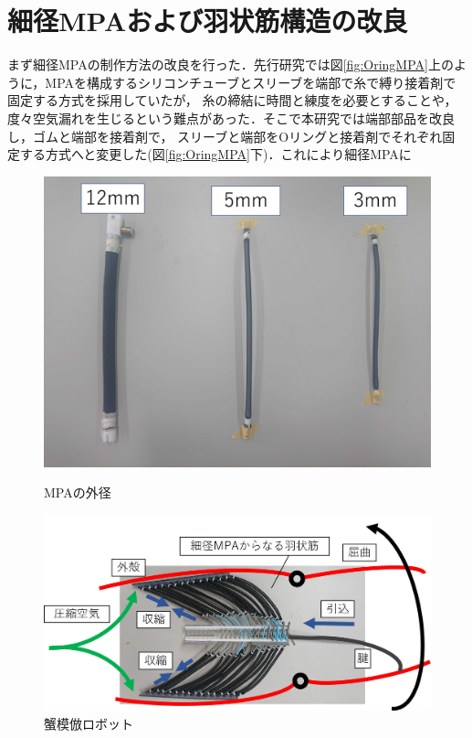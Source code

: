 \documentclass{jarticle}
\begin{document}
\vspace*{-2mm}
\section{細径MPAおよび羽状筋構造の改良}

まず細径MPAの制作方法の改良を行った．先行研究では図\ref{fig:OringMPA}上のように，MPAを構成するシリコンチューブとスリーブを端部で糸で縛り接着剤で固定する方式を採用していたが，
糸の締結に時間と練度を必要とすることや，度々空気漏れを生じるという難点があった．そこで本研究では端部部品を改良し，ゴムと端部を接着剤で，
スリーブと端部をOリングと接着剤でそれぞれ固定する方式へと変更した(図\ref{fig:OringMPA}下)．これにより細径MPAに
\begin{figure}[H]
  \begin{minipage}[b]{0.47\columnwidth}
    \centering
    \includegraphics[scale=0.11]{mpa.JPG}
    \vspace{-4mm}
    \caption{MPAの外径}
    \label{fig:MPA}
  \end{minipage}
  \hspace{0.04\columnwidth}
  \begin{minipage}[b]{0.47\columnwidth}
    \centering
    \includegraphics[scale=0.18]{mosiki.JPG}
    \vspace{-6mm}
    \caption{蟹模倣ロボット\cite{crabrobot2}}
    \label{fig:crabrobot}
  \end{minipage}
\end{figure}
\end{document}
